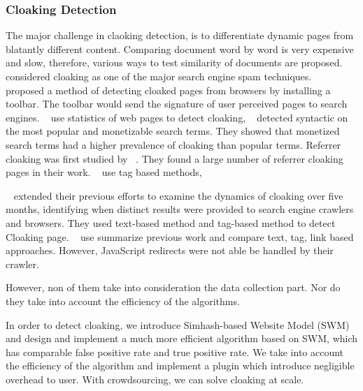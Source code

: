 \subsubsection{Cloaking Detection}
The major challenge in claoking detection, is to differentiate dynamic pages
from blatantly different content.
Comparing document word by word is very expensive and slow, therefore, 
various ways to test similarity of documents are proposed. 
~\cite{henzinger2002challenges}
 considered cloaking as one of the major search engine spam
techniques.
 ~\cite{najork2005system} proposed a method of detecting cloaked pages from browsers by
 installing a toolbar. The toolbar would send the signature of user perceived
 pages to search engines.
 ~\cite{wu2006detecting} use statistics of web pages to detect cloaking,
~\cite{chellapilla2006improving} detected syntactic on the most popular and
 monetizable search terms. They showed that monetized search terms had a higher
 prevalence of cloaking than popular terms.
 Referrer cloaking was first studied by ~\cite{wang2006detecting}. They found
 a large number of referrer cloaking pages in their work.
 ~\cite{lin2009detection} use tag based methods,

 ~\cite{wang2011cloak}
 extended their previous efforts to examine the dynamics of cloaking over five
 months, identifying when distinct results were provided to search engine
 crawlers and browsers.
They used text-based method and tag-based method to detect Cloaking page.
 ~\cite{deng2013uncovering} use summarize previous work and compare text, tag,
 link based approaches. However, JavaScript redirects were not able be handled by their crawler.

However, non of them take into consideration the data collection part. Nor do
they take into account the efficiency of the algorithms.

In order to detect cloaking, we introduce Simhash-based Website Model (SWM) and
design and implement a much more efficient algorithm based on SWM, which has
comparable false positive rate and true positive rate. We take into account the
efficiency of the algorithm and implement a plugin which introduce negligible
overhead to user. With crowdsourcing, we can solve cloaking at scale.



